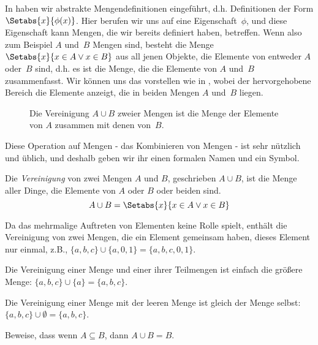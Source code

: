 \documentclass[../../../include/open-logic-section]{subfiles}
\begin{document}

\begin{explain}
In  haben wir abstrakte Mengendefinitionen eingeführt,
 d.h. Definitionen der Form $\Setabs{x}{\phi(x)}$.
Hier berufen wir uns auf eine Eigenschaft~$\phi$, und diese Eigenschaft kann
Mengen, die wir bereits definiert haben, betreffen. Wenn also zum Beispiel $A$ und~$B$ Mengen sind,
besteht die Menge $\Setabs{x}{x \in A \lor x \in B}$ aus all jenen
Objekte, die Elemente von entweder $A$ oder~$B$ sind, d.h. es ist die
Menge, die die Elemente von $A$ und~$B$ zusammenfasst. Wir können uns das vorstellen
wie in , wobei der hervorgehobene Bereich die
Elemente anzeigt, die in beiden Mengen $A$ und~$B$ liegen.

\begin{figure}
  \caption{Die Vereinigung $A \cup B$ zweier Mengen ist die Menge der Elemente von
   $A$ zusammen mit denen von~$B$.}
\end{figure}

Diese Operation auf Mengen - das Kombinieren von Mengen - ist sehr nützlich und üblich,
und deshalb geben wir ihr einen formalen Namen und ein Symbol. 
\end{explain}

\begin{defn}[Vereinigung]
Die \emph{Vereinigung} von zwei Mengen $A$ und $B$, geschrieben $A \cup B$, ist die
Menge aller Dinge, die Elemente von $A$ oder $B$ oder beiden sind.
\[
A \cup B = \Setabs{x}{x \in A \lor x \in B}
\]
\end{defn}

\begin{ex}
Da das mehrmalige Auftreten von Elementen keine Rolle spielt, enthält die Vereinigung von zwei
Mengen, die ein Element gemeinsam haben, dieses Element nur einmal,
z.B., $\{ a, b, c\} \cup \{ a, 0, 1\} = \{a, b, c, 0, 1\}$.

Die Vereinigung einer Menge und einer ihrer Teilmengen ist einfach die größere Menge: $\{a,
b, c \} \cup \{a \} = \{a, b, c\}$.

Die Vereinigung einer Menge mit der leeren Menge ist gleich der Menge selbst: $\{a,
b, c \} \cup \emptyset = \{a, b, c \}$.
\end{ex}

\begin{prob}
Beweise, dass wenn $A \subseteq B$, dann $A \cup B = B$.
\end{prob}
\end{document}
